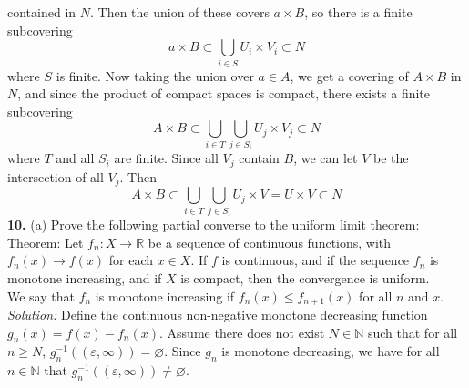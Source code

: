 \documentclass[a4paper]{article}
\begin{document}
        contained in $N$. Then the union of these covers $a \times B$, so there
        is a finite subcovering
        \[
        a \times B \subset \bigcup_{i \in S} U_i \times V_{i} \subset N
        \] 
        where $S$ is finite. Now taking the union over $a \in A$, we get
        a covering of $A \times B$ in $N$, and since the product of compact
        spaces is compact, there exists a finite subcovering
        \[
        A \times B \subset \bigcup_{i \in T} \bigcup_{j \in S_i} U_j \times
        V_{j} \subset N
        \] 
        where $T$ and all $S_i$ are finite. Since all $V_j$ contain $B$, we 
        can let $V$ be the intersection of all $V_j$. Then
        \[
        A \times B \subset \bigcup_{i \in T} \bigcup_{j \in S_i} U_j \times
        V = U \times V \subset N
        \] 
       \newpage 
        \textbf{10.} (a) Prove the following partial converse to the uniform
        limit theorem:\\
        Theorem: Let $f_{n}  \colon X \to \mathbb{R}$ be a sequence of
        continuous functions, with $f_n (x) \to f(x)$ for each $x \in X$.
        If $f$ is continuous, and if the sequence $f_n$ is monotone increasing,
        and if $X$ is compact, then the convergence is uniform.\\
        We say that $f_n$ is monotone increasing if $f_n (x) \le f_{n+1}(x)$ 
        for all $n$ and $x$.\\
        \linebreak
        \textit{Solution:} Define the continuous non-negative monotone
        decreasing function
        $g_n (x) = f(x) - f_n(x).$ Assume there does not exist $N \in
        \mathbb{N}$ such that for all $n\ge N$, 
        $g_n^{-1}\left( \left( \varepsilon , \infty \right)  \right) =
        \varnothing$. Since $g_n$ is monotone decreasing, we have for all $n
        \in \mathbb{N}$ that $g_n^{-1}\left(  \left( \varepsilon ,\infty
        \right)  \right) \neq \varnothing$.
\end{document}
